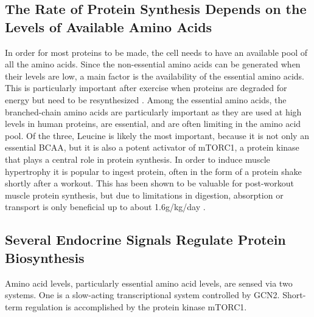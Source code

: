 \documentclass{tufte-handout}
\begin{document}
\subsection{The Rate of Protein Synthesis Depends on the Levels of Available Amino Acids}

In order for most proteins to be made, the cell needs to have an available pool of all the amino acids.  Since the non-essential amino acids can be generated when their levels are low, a main factor is the availability of the essential amino acids.  This is particularly important after exercise when proteins are degraded for energy but need to be resynthesized \citep{Tipton1999}.  Among the essential amino acids, the branched-chain amino acids are particularly important as they are used at high levels in human proteins, are essential, and are often limiting in the amino acid pool.  Of the three, Leucine is likely the most important, because it is not only an essential BCAA, but it is also a potent activator of mTORC1, a protein kinase that plays a central role in protein synthesis.   In order to induce muscle hypertrophy it is popular to ingest protein, often in the form of a protein shake shortly after a workout.  This has been shown to be valuable for post-workout muscle protein synthesis, but due to limitations in digestion, absorption or transport is only beneficial up to about 1.6g/kg/day \citep{Morton2017}.

\subsection{Several Endocrine Signals Regulate Protein Biosynthesis}

Amino acid levels, particularly essential amino acid levels, are sensed via two systems.  One is a slow-acting transcriptional system controlled by GCN2.  Short-term regulation is accomplished by the protein kinase mTORC1.
\end{document}
